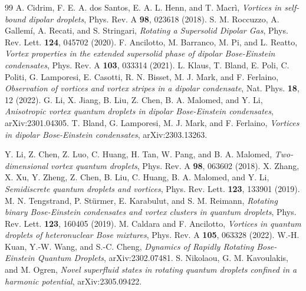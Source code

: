\documentclass[reprint,aps,prl,twocolumn,superscriptaddress]{revtex4-1}
\begin{document}
\begin{thebibliography}{99}
     A. Cidrim, F. E. A. dos Santos, E. A. L. Henn, and T. Macrì, \textit{Vortices in self-bound dipolar droplets},  {Phys. Rev. A {\bf 98}, 023618 (2018)}.
     S. M. Roccuzzo, A. Gallemí, A. Recati, and S. Stringari, \textit{Rotating a Supersolid Dipolar Gas},  {Phys. Rev. Lett. {\bf 124}, 045702 (2020)}.
     F. Ancilotto, M. Barranco, M. Pi, and L. Reatto, \textit{Vortex properties in the extended supersolid phase of dipolar Bose-Einstein condensates},  {Phys. Rev. A {\bf 103}, 033314 (2021)}.
     L. Klaus, T. Bland, E. Poli, C. Politi, G. Lamporesi, E. Casotti, R. N. Bisset, M. J. Mark, and F. Ferlaino, \textit{Observation of vortices and vortex stripes in a dipolar condensate},  {Nat. Phys. {\bf 18}, 12 (2022)}.
     G. Li, X. Jiang, B. Liu, Z. Chen, B. A. Malomed, and Y. Li, \textit{Anisotropic vortex quantum droplets in dipolar Bose-Einstein condensates}, arXiv:2301.04305.
     T. Bland, G. Lamporesi, M. J. Mark, and F. Ferlaino, \textit{Vortices in dipolar Bose-Einstein condensates}, arXiv:2303.13263.
    
     Y. Li, Z. Chen, Z. Luo, C. Huang, H. Tan, W. Pang, and B. A. Malomed, \textit{Two-dimensional vortex quantum droplets},  {Phys. Rev. A {\bf 98}, 063602 (2018)}.
     X. Zhang, X. Xu, Y. Zheng, Z. Chen, B. Liu, C. Huang, B. A. Malomed, and Y. Li, \textit{Semidiscrete quantum droplets and vortices},  {Phys. Rev. Lett. {\bf 123}, 133901 (2019)}.
     M. N. Tengstrand, P. Stürmer, E. Karabulut, and S. M. Reimann, \textit{Rotating binary Bose-Einstein condensates and vortex clusters in quantum droplets},  {Phys. Rev. Lett. {\bf 123}, 160405 (2019)}.
     M. Caldara and F. Ancilotto, \textit{Vortices in quantum droplets of heteronuclear Bose mixtures},  {Phys. Rev. A {\bf 105}, 063328 (2022)}.
     W.-H. Kuan, Y.-W. Wang, and S.-C. Cheng, \textit{Dynamics of Rapidly Rotating Bose-Einstein Quantum Droplets}, arXiv:2302.07481.
     S. Nikolaou, G. M. Kavoulakis, and M. Ogren, \textit{Novel superfluid states in rotating quantum droplets confined in a harmonic potential}, arXiv:2305.09422.


\end{thebibliography}
\end{document}
